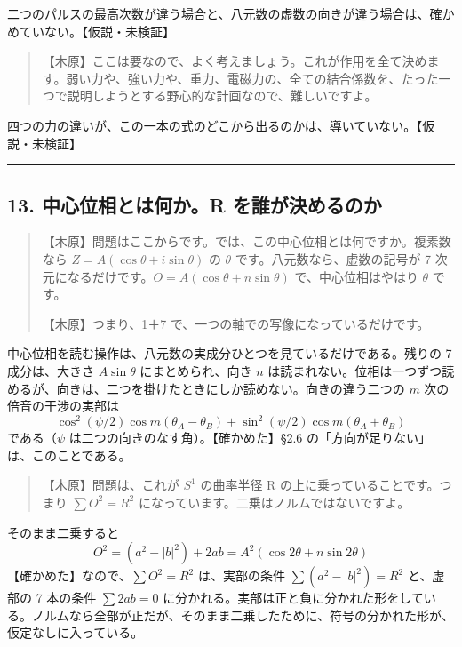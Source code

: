 \documentclass[
  a4paper,
]{ltjsarticle}
\begin{document}
二つのパルスの最高次数が違う場合と、八元数の虚数の向きが違う場合は、確かめていない。【仮説・未検証】

\begin{quote}
【木原】ここは要なので、よく考えましょう。これが作用を全て決めます。弱い力や、強い力や、重力、電磁力の、全ての結合係数を、たった一つで説明しようとする野心的な計画なので、難しいですよ。
\end{quote}

四つの力の違いが、この一本の式のどこから出るのかは、導いていない。【仮説・未検証】

\begin{center}\rule{0.5\linewidth}{0.5pt}\end{center}

\subsection{13. 中心位相とは何か。R
を誰が決めるのか}\label{ux4e2dux5fc3ux4f4dux76f8ux3068ux306fux4f55ux304br-ux3092ux8ab0ux304cux6c7aux3081ux308bux306eux304b}

\begin{quote}
【木原】問題はここからです。では、この中心位相とは何ですか。複素数なら
\(Z = A(\cos\theta + i\sin\theta)\) の \(\theta\)
です。八元数なら、虚数の記号が 7
次元になるだけです。\(O = A(\cos\theta + n\sin\theta)\)
で、中心位相はやはり \(\theta\) です。

【木原】つまり、1＋7 で、一つの軸での写像になっているだけです。
\end{quote}

中心位相を読む操作は、八元数の実成分ひとつを見ているだけである。残りの 7
成分は、大きさ \(A\sin\theta\) にまとめられ、向き \(n\)
は読まれない。位相は一つずつ読めるが、向きは、二つを掛けたときにしか読めない。向きの違う二つの
\(m\) 次の倍音の干渉の実部は \[
\cos^2(\psi/2)\cos m(\theta_A - \theta_B) + \sin^2(\psi/2)\cos m(\theta_A + \theta_B) \tag{13.1}
\] である（\(\psi\) は二つの向きのなす角）。【確かめた】§2.6
の「方向が足りない」は、このことである。

\begin{quote}
【木原】問題は、これが \(S^1\) の曲率半径 R
の上に乗っていることです。つまり \(\sum O^2 = R^2\)
になっています。二乗はノルムではないですよ。
\end{quote}

そのまま二乗すると \[
O^2 = (a^2 - \lvert b\rvert^2) + 2ab = A^2(\cos2\theta + n\sin2\theta) \tag{13.2}
\] 【確かめた】なので、\(\sum O^2 = R^2\) は、実部の条件
\(\sum(a^2 - \lvert b\rvert^2) = R^2\) と、虚部の 7 本の条件
\(\sum 2ab = 0\)
に分かれる。実部は正と負に分かれた形をしている。ノルムなら全部が正だが、そのまま二乗したために、符号の分かれた形が、仮定なしに入っている。
\end{document}
